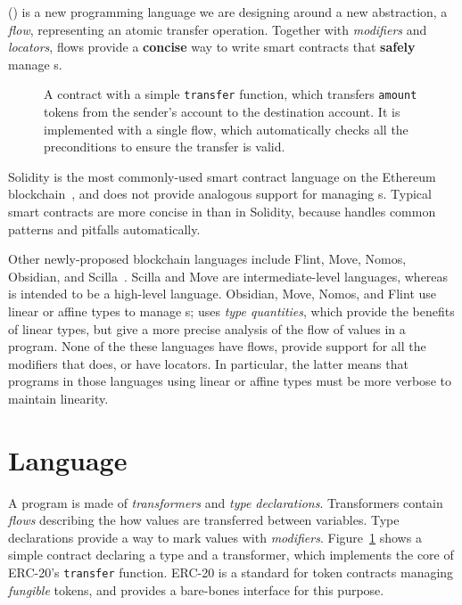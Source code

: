 \documentclass[dvipsnames,runningheads]{llncs}
\begin{document}
\langName (\langNamePronounce) is a new programming language we are designing around a new abstraction, a \emph{flow}, representing an atomic transfer operation.
Together with \emph{modifiers} and \emph{locators}, flows provide a \textbf{concise} way to write smart contracts that \textbf{safely} manage \assetTxt{}s.
\begin{figure}
    \vspace{-2em}
    \centering
    
    \vspace{-1em}
    \caption{A \langName contract with a simple \lstinline{transfer} function, which transfers \lstinline{amount} tokens from the sender's account to the destination account.
It is implemented with a single flow, which automatically checks all the preconditions to ensure the transfer is valid.}
    \label{fig:erc20-transfer-flow}
    \vspace{-2em}
\end{figure}

Solidity is the most commonly-used smart contract language on the Ethereum blockchain~\cite{EthereumForDevs}, and does not provide analogous support for managing \assetTxt{}s.
Typical smart contracts are more concise in \langName than in Solidity, because \langName handles common patterns and pitfalls automatically.

Other newly-proposed blockchain languages include Flint, Move, Nomos, Obsidian, and Scilla~\cite{schrans2018flint,blackshear2019move,das2019nomos,coblenz2019obsidian,sergey2019scilla}.
Scilla and Move are intermediate-level languages, whereas \langName is intended to be a high-level language.
Obsidian, Move, Nomos, and Flint use linear or affine types to manage \assetTxt{}s; \langName uses \emph{type quantities}, which provide the benefits of linear types, but give a more precise analysis of the flow of values in a program.
None of the these languages have flows, provide support for all the modifiers that \langName does, or have locators.
In particular, the latter means that programs in those languages using linear or affine types must be more verbose to maintain linearity.

\section{Language}\label{sec:lang}
A \langName program is made of \emph{transformers} and \emph{type declarations}.
Transformers contain \emph{flows} describing the how values are transferred between variables.
Type declarations provide a way to mark values with \emph{modifiers}. %
Figure~\ref{fig:erc20-transfer-flow} shows a simple contract declaring a type and a transformer, which implements the core of ERC-20's \lstinline{transfer} function.
ERC-20 is a standard for token contracts managing \emph{fungible} tokens, and provides a bare-bones interface for this purpose.
\end{document}
